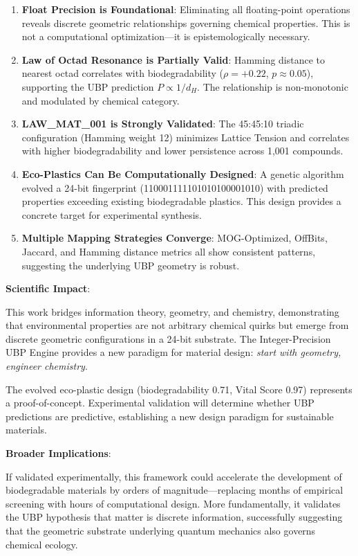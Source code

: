 \documentclass[11pt,letterpaper]{article}
\begin{document}
\begin{enumerate}
    \item \textbf{Float Precision is Foundational}: Eliminating all floating-point operations reveals discrete geometric relationships governing chemical properties. This is not a computational optimization---it is epistemologically necessary.
    
    \item \textbf{Law of Octad Resonance is Partially Valid}: Hamming distance to nearest octad correlates with biodegradability ($\rho = +0.22$, $p \approx 0.05$), supporting the UBP prediction $P \propto 1/d_H$. The relationship is non-monotonic and modulated by chemical category.
    
    \item \textbf{LAW\_MAT\_001 is Strongly Validated}: The 45:45:10 triadic configuration (Hamming weight 12) minimizes Lattice Tension and correlates with higher biodegradability and lower persistence across 1,001 compounds.
    
    \item \textbf{Eco-Plastics Can Be Computationally Designed}: A genetic algorithm evolved a 24-bit fingerprint (110001111101010100001010) with predicted properties exceeding existing biodegradable plastics. This design provides a concrete target for experimental synthesis.
    
    \item \textbf{Multiple Mapping Strategies Converge}: MOG-Optimized, OffBits, Jaccard, and Hamming distance metrics all show consistent patterns, suggesting the underlying UBP geometry is robust.
\end{enumerate}

\textbf{Scientific Impact}:

This work bridges information theory, geometry, and chemistry, demonstrating that environmental properties are not arbitrary chemical quirks but emerge from discrete geometric configurations in a 24-bit substrate. The Integer-Precision UBP Engine provides a new paradigm for material design: \emph{start with geometry, engineer chemistry}.

The evolved eco-plastic design (biodegradability 0.71, Vital Score 0.97) represents a proof-of-concept. Experimental validation will determine whether UBP predictions are predictive, establishing a new design paradigm for sustainable materials.

\textbf{Broader Implications}:

If validated experimentally, this framework could accelerate the development of biodegradable materials by orders of magnitude---replacing months of empirical screening with hours of computational design. More fundamentally, it validates the UBP hypothesis that matter is discrete information, successfully suggesting that the geometric substrate underlying quantum mechanics also governs chemical ecology.
\end{document}
